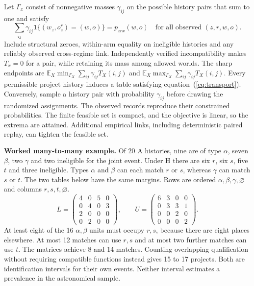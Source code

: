 \documentclass[11pt,a4paper]{article}
\newcommand{\lead}[1]{\textbf{#1}\enspace}
\newcommand{\E}{\mathbb{E}}
\newcommand{\ind}{\mathbf{1}}
\begin{document}
Let $\Gamma_x$ consist of nonnegative masses $\gamma_{ij}$ on the possible history pairs that sum to one and satisfy
\begin{equation}
 \sum_{ij}\gamma_{ij}\ind\{(w_z,o_z^r)=(w,o)\}=p_{zrx}(w,o)
 \quad\text{for all observed }(z,r,w,o).\label{eq:transport}
\end{equation}
Include structural zeroes, within-arm equality on ineligible histories and any reliably observed cross-regime link. Independently verified incompatibility makes $T_x=0$ for a pair, while retaining its mass among allowed worlds. The sharp endpoints are $\E_X\min_{\Gamma_X}\sum_{ij}\gamma_{ij}T_X(i,j)$ and $\E_X\max_{\Gamma_X}\sum_{ij}\gamma_{ij}T_X(i,j)$. Every permissible project history induces a table satisfying equation~(\ref{eq:transport}). Conversely, sample a history pair with probability $\gamma_{ij}$ before drawing the randomized assignments. The observed records reproduce their constrained probabilities. The finite feasible set is compact, and the objective is linear, so the extrema are attained. Additional empirical links, including deterministic paired replay, can tighten the feasible set.

\lead{Worked many-to-many example.} Of 20 A histories, nine are of type $\alpha$, seven $\beta$, two $\gamma$ and two ineligible for the joint event. Under H there are six $r$, six $s$, five $t$ and three ineligible. Types $\alpha$ and $\beta$ can each match $r$ or $s$, whereas $\gamma$ can match $s$ or $t$. The two tables below have the same margins. Rows are ordered $\alpha,\beta,\gamma,\varnothing$ and columns $r,s,t,\varnothing$.
\[
 L=\begin{pmatrix}4&0&5&0\\0&4&0&3\\2&0&0&0\\0&2&0&0\end{pmatrix},
 \qquad
 U=\begin{pmatrix}6&3&0&0\\0&3&3&1\\0&0&2&0\\0&0&0&2\end{pmatrix}.
\]
At least eight of the 16 $\alpha,\beta$ units must occupy $r,s$, because there are eight places elsewhere. At most 12 matches can use $r,s$ and at most two further matches can use $t$. The matrices achieve 8 and 14 matches. Counting overlapping qualification without requiring compatible functions instead gives 15 to 17 projects. Both are identification intervals for their own events. Neither interval estimates a prevalence in the astronomical sample.
\end{document}
